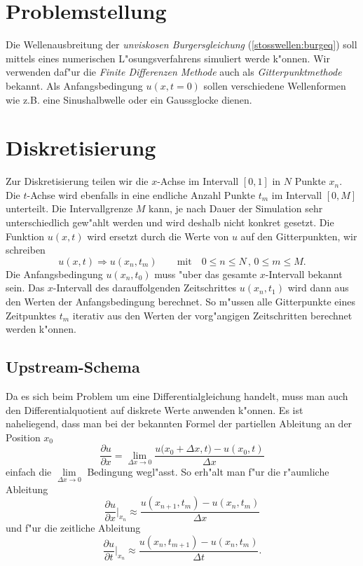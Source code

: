 \begin{refsection}
\section{Problemstellung}

Die Wellenausbreitung der \textit{unviskosen Burgersgleichung}
(\ref{stosswellen:burgeq}) soll mittels eines numerischen
L"osungsverfahrens simuliert werde k"onnen. Wir verwenden daf"ur die
\textit{Finite Differenzen Methode} auch als \textit{Gitterpunktmethode}
bekannt. Als Anfangsbedingung $u(x,t\!=\!0)$ sollen verschiedene
Wellenformen wie z.B. eine Sinushalbwelle oder ein Gaussglocke dienen. 

\section{Diskretisierung}
Zur Diskretisierung teilen wir die $x$-Achse im Intervall $[0,1]$ in $N$
Punkte $x_{n}$. Die $t$-Achse wird ebenfalls in eine endliche Anzahl
Punkte $t_{m}$ im Intervall $[0,M]$ unterteilt. Die Intervallgrenze
$M$ kann, je nach Dauer der Simulation sehr unterschiedlich gew"ahlt
werden und wird deshalb nicht konkret gesetzt. Die Funktion $u(x,t)$
wird ersetzt durch die Werte von $u$ auf den Gitterpunkten, wir schreiben
\begin{equation*}
	u(x,t) \Rightarrow u(x_{n},t_{m}) \qquad \text{mit} \quad 0 \leq n \leq N \, , \, 0\leq m \leq M.
\end{equation*}
Die Anfangsbedingung $u(x_n,t_0)$ muss "uber das gesamte $x$-Intervall
bekannt sein. Das $x$-Intervall des darauffolgenden Zeitschrittes
$u(x_n,t_1)$ wird dann aus den Werten der Anfangsbedingung berechnet. So
m"ussen alle Gitterpunkte eines Zeitpunktes $t_m$ iterativ aus den Werten
der vorg"angigen Zeitschritten berechnet werden k"onnen. 

\subsection{Upstream-Schema}
Da es sich beim Problem um eine Differentialgleichung handelt, muss man
auch den Differentialquotient auf diskrete Werte anwenden k"onnen. Es ist
naheliegend, dass man bei der bekannten Formel der partiellen Ableitung
an der Position $x_{0}$
\begin{equation}
	\frac{\partial u}{\partial x} = \lim\limits_{\Delta x \to 0} \frac{{u(x_{0}}\!+\!\Delta x,t)-u(x_{0},t)}{\Delta x}
\end{equation}
einfach die $\lim\limits_{\Delta x \to 0}$ Bedingung wegl"asst. So erh"alt man f"ur die r"aumliche Ableitung
\begin{equation}
	\frac{\partial u}{\partial x} \Bigg|_{x_{n}} \approx \frac{u(x_{n\!+\!1},t_{m})-u(x_{n},t_{m})}{\Delta x}
	\label{stosswellen:upsteamort}
\end{equation}
und f"ur die zeitliche Ableitung
\begin{equation}
	\frac{\partial u}{\partial t} \Bigg|_{x_{n}} \approx \frac{u(x_{n},t_{m\!+\!1})-u(x_{n},t_{m})}{\Delta t}.
	\label{stosswellen:eulerschritt}
\end{equation}


\end{refsection}

